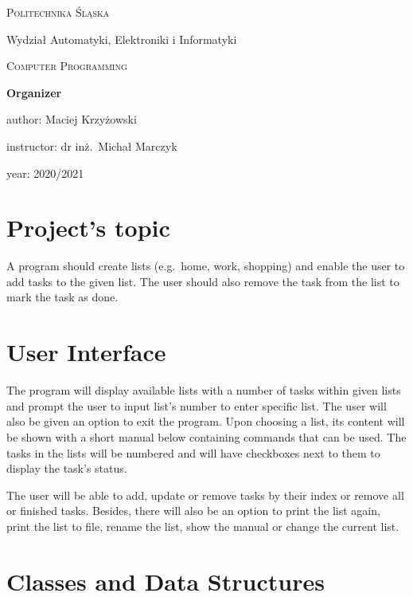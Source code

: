\documentclass{article}
\begin{document}
\begin{titlepage}
	\centering
	{\scshape\LARGE Politechnika Śląska

    Wydział Automatyki, Elektroniki i Informatyki\par}
	\vspace{1cm}
	{\scshape\Large Computer Programming\par}
	\vspace{1.5cm}
	{\huge\bfseries Organizer\par}
	\vspace{2cm}
	\vfill
	author:
	Maciej Krzyżowski\par 
	instructor:
	dr inż.~Michał Marczyk\par
	year:
	2020/2021 
	\vfill
\end{titlepage}

\renewcommand*\contentsname{Table of contents}
\tableofcontents
\pagebreak

\section{Project’s topic}

A program should create lists (e.g.\ home, work, shopping) and enable the user to add tasks to the given list. The user should also remove the task from the list to mark the task as done.


\section{User Interface}

The program will display available lists with a number of tasks within given lists and prompt the user to input list's number to enter specific list. The user will also be given an option to exit the program. Upon choosing a list, its content will be shown with a short manual below containing commands that can be used. The tasks in the lists will be numbered and will have checkboxes next to them to display the task's status.

The user will be able to add, update or remove tasks by their index or remove all or finished tasks. Besides, there will also be an option to print the list again, print the list to file, rename the list, show the manual or change the current list.

\section{Classes and Data Structures}
\end{document}

